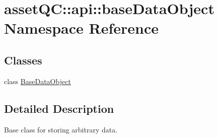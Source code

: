 \hypertarget{namespaceassetQC_1_1api_1_1baseDataObject}{\section{asset\-Q\-C\-:\-:api\-:\-:base\-Data\-Object \-Namespace \-Reference}
\label{d6/d8f/namespaceassetQC_1_1api_1_1baseDataObject}
}
\subsection*{\-Classes}
\begin{DoxyCompactItemize}
\item 
class \hyperlink{classassetQC_1_1api_1_1baseDataObject_1_1BaseDataObject}{\-Base\-Data\-Object}
\end{DoxyCompactItemize}


\subsection{\-Detailed \-Description}
\begin{DoxyVerb}
Base class for storing arbitrary data.
\end{DoxyVerb}
 